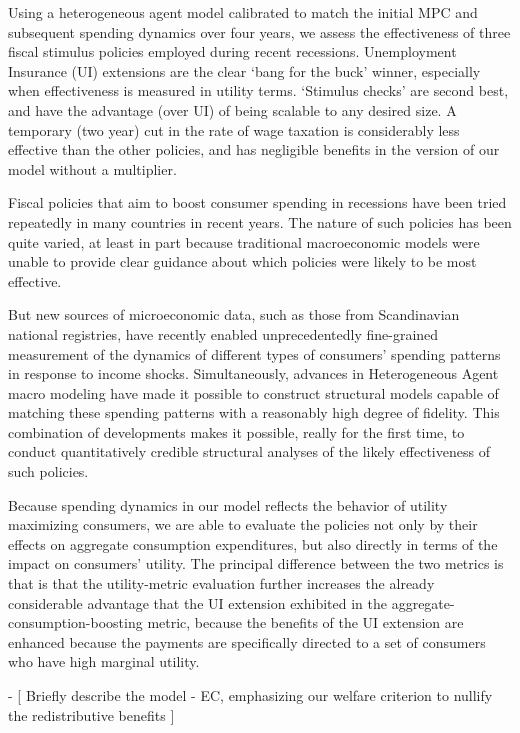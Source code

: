 \documentclass[../HAFiscal]{subfiles}
\begin{document}
Using a heterogeneous agent model calibrated to match the initial MPC and subsequent spending dynamics over four years, we assess the effectiveness of three fiscal stimulus policies employed during recent recessions.  Unemployment Insurance (UI) extensions are the clear `bang for the buck' winner, especially when effectiveness is measured in utility terms.  `Stimulus checks' are second best, and have the advantage (over UI) of being scalable to any desired size.  A temporary (two year) cut in the rate of wage taxation is considerably less effective than the other policies, and has negligible benefits in the version of our model without a multiplier.

Fiscal policies that aim to boost consumer spending in recessions have been tried repeatedly in many countries in recent years.  The nature of such policies has been quite varied, at least in part because traditional macroeconomic models were unable to provide clear guidance about which policies were likely to be most effective.

But new sources of microeconomic data, such as those from Scandinavian national registries, have recently enabled unprecedentedly fine-grained measurement of the dynamics of different types of consumers' spending patterns in response to income shocks.  Simultaneously, advances in Heterogeneous Agent macro modeling have made it possible to construct structural models capable of matching these spending patterns with a reasonably high degree of fidelity.  This combination of developments makes it possible, really for the first time, to conduct quantitatively credible structural analyses of the likely effectiveness of such policies.

Because spending dynamics in our model reflects the behavior of utility maximizing consumers, we are able to evaluate the policies not only by their effects on aggregate consumption expenditures, but also directly in terms of the impact on consumers' utility.  The principal difference between the two metrics is that is that the utility-metric evaluation further increases the already considerable advantage that the UI extension exhibited in the aggregate-consumption-boosting metric, because the benefits of the UI extension are enhanced because the payments are specifically directed to a set of consumers who have high marginal utility.

- [ Briefly describe the model - EC, emphasizing our welfare criterion to nullify the redistributive benefits ]
\end{document}

